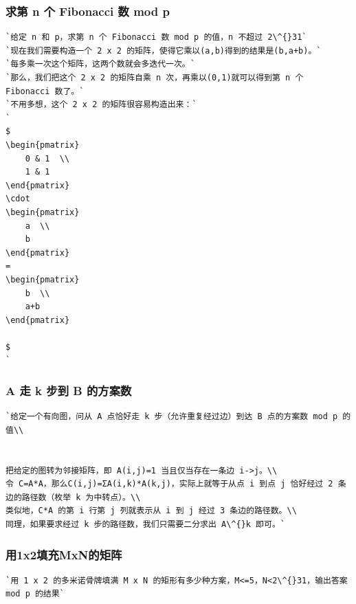 \documentclass[a4paper]{article}
\begin{document}
\begin{CJK*}{UTF8}{gbsn}
\begin{multicols}{3}
\begin{flushleft}
\subsubsection{求第 n 个 Fibonacci 数 mod p}
\begin{lstlisting}
`给定 n 和 p，求第 n 个 Fibonacci 数 mod p 的值，n 不超过 2\^{}31`
`现在我们需要构造一个 2 x 2 的矩阵，使得它乘以(a,b)得到的结果是(b,a+b)。`
`每多乘一次这个矩阵，这两个数就会多迭代一次。`
`那么，我们把这个 2 x 2 的矩阵自乘 n 次，再乘以(0,1)就可以得到第 n 个 Fibonacci 数了。`
`不用多想，这个 2 x 2 的矩阵很容易构造出来：`
`
$
\begin{pmatrix}
	0 & 1  \\
    1 & 1
\end{pmatrix}
\cdot
\begin{pmatrix}
	a  \\
    b 
\end{pmatrix}
=
\begin{pmatrix}
	b  \\
    a+b 
\end{pmatrix}

$
`
\end{lstlisting}

\subsubsection{A 走 k 步到 B 的方案数}
\begin{lstlisting}
`给定一个有向图，问从 A 点恰好走 k 步（允许重复经过边）到达 B 点的方案数 mod p 的值\\


把给定的图转为邻接矩阵，即 A(i,j)=1 当且仅当存在一条边 i->j。\\
令 C=A*A，那么C(i,j)=ΣA(i,k)*A(k,j)，实际上就等于从点 i 到点 j 恰好经过 2 条边的路径数（枚举 k 为中转点）。\\
类似地，C*A 的第 i 行第 j 列就表示从 i 到 j 经过 3 条边的路径数。\\
同理，如果要求经过 k 步的路径数，我们只需要二分求出 A\^{}k 即可。`
\end{lstlisting}

\subsubsection{用1x2填充MxN的矩阵}
\begin{lstlisting}
`用 1 x 2 的多米诺骨牌填满 M x N 的矩形有多少种方案，M<=5，N<2\^{}31，输出答案 mod p 的结果`
\end{lstlisting}


\end{flushleft}
\end{multicols}
\end{CJK*}
\end{document}
